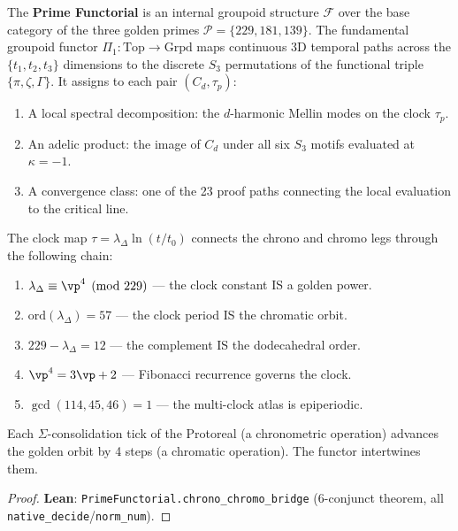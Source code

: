 \begin{definition}
The \textbf{Prime Functorial} is an internal groupoid structure $\mathcal{F}$ over the base category of the three golden primes $\mathcal{P} = \{229, 181, 139\}$. The fundamental groupoid functor $\Pi_1: \text{Top} \to \text{Grpd}$ maps continuous 3D temporal paths across the $\{t_1, t_2, t_3\}$ dimensions to the discrete $S_3$ permutations of the functional triple $\{\pi, \zeta, \Gamma\}$. It assigns to each pair $(C_d, \tau_p)$:
\begin{enumerate}[noitemsep]
\item A local spectral decomposition: the $d$-harmonic Mellin modes on the clock $\tau_p$.
\item An adelic product: the image of $C_d$ under all six $S_3$ motifs evaluated at $\kappa = -1$.
\item A convergence class: one of the 23 proof paths connecting the local evaluation to the critical line.
\end{enumerate}
\end{definition}

\begin{theorem}
\label{thm:chrono-chromo}
The clock map $\tau = \lambda_\Delta \ln(t/t_0)$ connects the chrono and chromo legs through the following chain:
\begin{enumerate}[noitemsep]
\item $\lambda_\Delta \equiv \vp^4 \pmod{229}$ --- the clock constant IS a golden power.
\item $\mathrm{ord}(\lambda_\Delta) = 57$ --- the clock period IS the chromatic orbit.
\item $229 - \lambda_\Delta = 12$ --- the complement IS the dodecahedral order.
\item $\vp^4 = 3\vp + 2$ --- Fibonacci recurrence governs the clock.
\item $\gcd(114, 45, 46) = 1$ --- the multi-clock atlas is epiperiodic.
\end{enumerate}
Each $\Sigma$-consolidation tick of the Protoreal (a chronometric operation) advances the golden orbit by 4 steps (a chromatic operation).  The functor intertwines them.
\end{theorem}

\begin{proof}
\textbf{Lean}: \texttt{PrimeFunctorial.chrono\_chromo\_bridge} (6-conjunct theorem, all \texttt{native\_decide}/\texttt{norm\_num}).
\end{proof}



